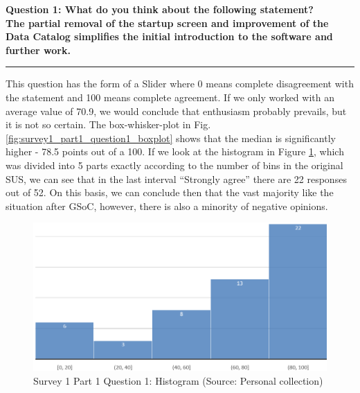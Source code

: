 \documentclass[a4paper,10pt,twoside]{article}
\begin{document}
\newpage
\noindent \textbf{Question 1: What do you think about the following statement? \\
The partial removal of the startup screen and improvement of the Data Catalog simplifies the initial introduction to the software and further work.}
\par\noindent\rule{\textwidth}{0.4pt}

\noindent This question has the form of a Slider where 0 means complete disagreement with the statement and 100 means complete agreement. If we only worked with an average value of 70.9, we would conclude that enthusiasm probably prevails, but it is not so certain. The box-whisker-plot in Fig. \ref{fig:survey1_part1_question1_boxplot} shows that the median is significantly higher - 78.5 points out of a 100. If we look at the histogram in Figure \ref{fig:survey1_part1_question1_histogram}, which was divided into 5 parts exactly according to the number of bins in the original SUS, we can see that in the last interval ``Strongly agree'' there are 22 responses out of 52. On this basis, we can conclude then that the vast majority like the situation after GSoC, however, there is also a minority of negative opinions.

\begin{figure}[hbt!] 
\begin{center}
\includegraphics[width=12cm]{../surveys/analyzed_data/survey1_part1_question1_excel_histogram.png} 
\caption[Survey 1 Part 1 Question 1: Histogram]{Survey 1 Part 1 Question 1: Histogram (Source: Personal collection)}
\label{fig:survey1_part1_question1_histogram}
\end{center}
\end{figure}
\end{document}
